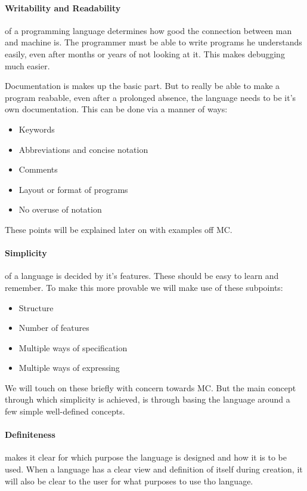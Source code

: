 \begin{multicols}{2}
\paragraph{Writability and Readability}
of a programming language determines how good the connection between man and machine is. The programmer must be able to write programs he understands easily, even after months or years of not looking at it. This makes debugging much easier.

Documentation is makes up the basic part. But to really be able to make a program reabable, even after a prolonged absence, the language needs to be it's own documentation. This can be done via a manner of ways:
\begin{itemize}
  \item Keywords
  \item Abbreviations and concise notation
  \item Comments
  \item Layout or format of programs
  \item No overuse of notation
\end{itemize}
These points will be explained later on with examples off MC.\cite{}

\paragraph{Simplicity}
of a language is decided by it's features. These should be easy to learn and remember. To make this more provable we will make use of these subpoints:
\begin{itemize}
  \item Structure
  \item Number of features
  \item Multiple ways of specification
  \item Multiple ways of expressing
\end{itemize}
We will touch on these briefly with concern towards MC.\cite{} But the main concept through which simplicity is achieved, is through basing the language around a few simple well-defined concepts.\cite{}

\paragraph{Definiteness}
makes it clear for which purpose the language is designed and how it is to be used. When a language has a clear view and definition of itself during creation, it will also be clear to the user for what purposes to use tho language.


\end{multicols}
